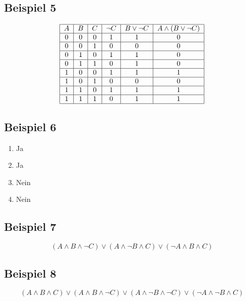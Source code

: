 \documentclass[12pt, a4paper, oneside]{article}
\begin{document}
\subsection{Beispiel 5}
\begin{equation*}
  \begin{tabular}{| c | c | c | c | c | c |}
    \hline
    $A$ & $B$ & $C$ & $\lnot C$ & $B \lor \lnot C$ & $A \land (B \lor \lnot C)$ \\ \hline
    0 & 0 & 0 & 1 & 1 & 0 \\ \hline
    0 & 0 & 1 & 0 & 0 & 0 \\ \hline
    0 & 1 & 0 & 1 & 1 & 0 \\ \hline
    0 & 1 & 1 & 0 & 1 & 0 \\ \hline
    1 & 0 & 0 & 1 & 1 & 1 \\ \hline
    1 & 0 & 1 & 0 & 0 & 0 \\ \hline
    1 & 1 & 0 & 1 & 1 & 1 \\ \hline
    1 & 1 & 1 & 0 & 1 & 1 \\ \hline
  \end{tabular}
\end{equation*}

\subsection{Beispiel 6}
\begin{enumerate}
  \item Ja
  \item Ja
  \item Nein
  \item Nein
\end{enumerate}

\subsection{Beispiel 7}
\begin{equation*}
  (A \land B \land \lnot C) \lor (A \land \lnot B \land C) \lor (\lnot A \land B \land C)
\end{equation*}

\subsection{Beispiel 8}
\begin{equation*}
  (A \land B \land C) \lor (A \land B \land \lnot C) \lor (A \land \lnot B \land \lnot C) \lor (\lnot A \land \lnot B \land C)
\end{equation*}
\end{document}
